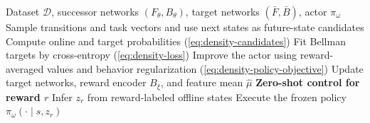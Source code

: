 \begin{algorithm}[t]
    \caption{\name{} training and zero-shot control}
    \label{alg:density-fb}
    \begin{algorithmic}[1]
        \Require Dataset $\mathcal D$, successor networks $(F_\theta,B_\theta)$, target networks $(\bar F,\bar B)$,
        actor $\pi_\omega$
            \State Sample transitions and task vectors and use next states as future-state candidates
            \State Compute online and target probabilities (\cref{eq:density-candidates})
            \State Fit Bellman targets by cross-entropy (\cref{eq:density-loss})
            \State Improve the actor using reward-averaged values and behavior regularization (\cref{eq:density-policy-objective})
            \State Update target networks, reward encoder $B_\xi$, and feature mean $\hat\mu$
        \EndFor
        \Statex \textbf{Zero-shot control for reward $r$}
        \State Infer $z_r$ from reward-labeled offline states
        \State Execute the frozen policy $\pi_\omega(\cdot\mid s,z_r)$
    \end{algorithmic}
\end{algorithm}